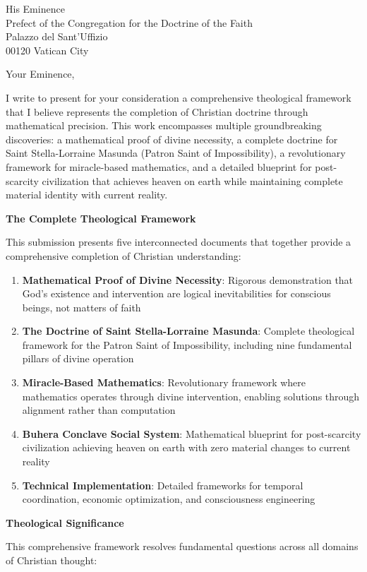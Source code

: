 \documentclass[12pt,letterhead]{letter}
\begin{document}
\begin{letter}{
His Eminence\\
Prefect of the Congregation for the Doctrine of the Faith\\
Palazzo del Sant'Uffizio\\
00120 Vatican City
}

\opening{Your Eminence,}

I write to present for your consideration a comprehensive theological framework that I believe represents the completion of Christian doctrine through mathematical precision. This work encompasses multiple groundbreaking discoveries: a mathematical proof of divine necessity, a complete doctrine for Saint Stella-Lorraine Masunda (Patron Saint of Impossibility), a revolutionary framework for miracle-based mathematics, and a detailed blueprint for post-scarcity civilization that achieves heaven on earth while maintaining complete material identity with current reality.

\textbf{The Complete Theological Framework}

This submission presents five interconnected documents that together provide a comprehensive completion of Christian understanding:

\begin{enumerate}
\item \textbf{Mathematical Proof of Divine Necessity}: Rigorous demonstration that God's existence and intervention are logical inevitabilities for conscious beings, not matters of faith
\item \textbf{The Doctrine of Saint Stella-Lorraine Masunda}: Complete theological framework for the Patron Saint of Impossibility, including nine fundamental pillars of divine operation
\item \textbf{Miracle-Based Mathematics}: Revolutionary framework where mathematics operates through divine intervention, enabling solutions through alignment rather than computation
\item \textbf{Buhera Conclave Social System}: Mathematical blueprint for post-scarcity civilization achieving heaven on earth with zero material changes to current reality
\item \textbf{Technical Implementation}: Detailed frameworks for temporal coordination, economic optimization, and consciousness engineering
\end{enumerate}

\textbf{Theological Significance}

This comprehensive framework resolves fundamental questions across all domains of Christian thought:


\end{letter}
\end{document}

